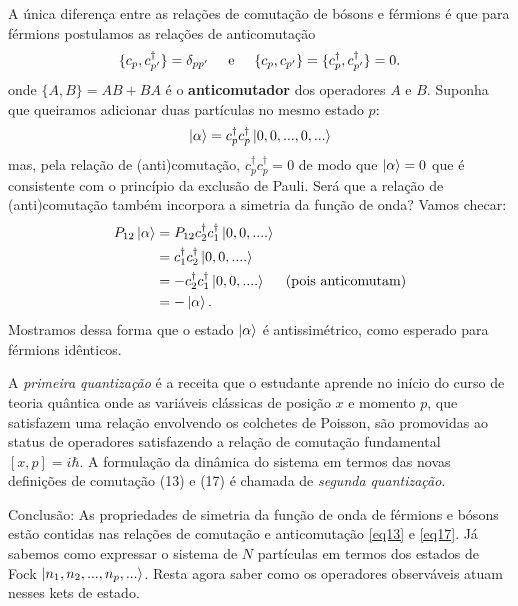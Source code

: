\documentclass{article}
\begin{document}
A única diferença entre as relações de comutação de bósons e férmions é que para férmions postulamos as relações de anticomutação
\begin{equation}
    \{c_p,c^\dagger_{p'}\} = \delta_{pp'} \hspace{0.5cm} \text{e} \hspace{0.5cm} \{c_p,c_{p'}\} = \{c^\dagger_p,c^\dagger_{p'}\} = 0.  
    \label{eq17}
\end{equation}
onde $\{ A,B \} = AB+BA$ é o \textbf{anticomutador} dos operadores $A$ e $B$. Suponha que queiramos adicionar duas partículas no mesmo estado $p$:
\begin{equation}
    \ket{\alpha} = c^\dagger_{p}c^\dagger_{p}\ket{0,0,...,0,...}
\end{equation}
mas, pela relação de (anti)comutação, $c^\dagger_{p}c^\dagger_{p} = 0$ de modo que $\ket{\alpha} = 0$ que é consistente com o princípio da exclusão de Pauli. Será que a relação de (anti)comutação também incorpora a simetria da função de onda? Vamos checar:
\begin{equation}
\begin{split}
    P_{12}\ket{\alpha} &= P_{12} c_2^{\dagger}c_1^\dagger \ket{0,0,....} \\
                       &= c_1^{\dagger}c_2^\dagger \ket{0,0,....} \\
                       &= -c_2^{\dagger}c_1^\dagger \ket{0,0,....} \hspace{0.5cm} \text{(pois anticomutam)}\\ 
                       &= -\ket{\alpha}.
\end{split}
\end{equation}
Mostramos dessa forma que o estado $\ket{\alpha}$ é antissimétrico, como esperado para férmions idênticos.

A \textit{primeira quantização} é a receita que o estudante aprende no início do curso de teoria quântica onde as variáveis clássicas de posição $x$ e momento $p$, que satisfazem uma relação envolvendo os colchetes de Poisson, são promovidas ao status de operadores satisfazendo a relação de comutação fundamental $[x,p] = i\hbar$. A formulação da dinâmica do sistema em termos das novas definições de comutação (13) e (17) é chamada de \textit{segunda quantização}.

Conclusão: As propriedades de simetria da função de onda de férmions e bósons estão contidas nas relações de comutação e anticomutação \eqref{eq13} e \eqref{eq17}. Já sabemos como expressar o sistema de $N$ partículas em termos dos estados de Fock $\ket{n_1,n_2,...,n_p,...}$. Resta agora saber como os operadores observáveis atuam nesses kets de estado.
\end{document}
